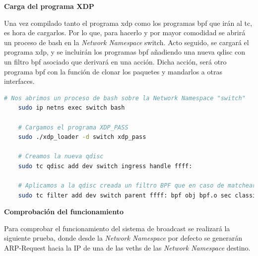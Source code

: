 \vspace{1cm}
\textbf{Carga del programa XDP}\\
\par
Una vez compilado tanto el programa \gls{xdp} como los programas \gls{bpf} que irán al \gls{tc}, es hora de cargarlos. Por lo que, para hacerlo y por mayor comodidad se abrirá un proceso de bash en la \textit{Network Namespace} switch. Acto seguido, se cargará el programa \gls{xdp}, y se incluirán los programas \gls{bpf} añadiendo una nueva qdisc con un filtro \gls{bpf} asociado que derivará en una acción. Dicha acción, será otro programa \gls{bpf} con la función de clonar los paquetes y mandarlos a otras interfaces.\\
\par
\begin{lstlisting}[language= bash, style=Consola, caption={Carga del programa XDP - Case05},label=code:case05_xdp_ether_load]
    # Nos abrimos un proceso de bash sobre la Network Namespace "switch"
    sudo ip netns exec switch bash
    
    # Cargamos el programa XDP_PASS
    sudo ./xdp_loader -d switch xdp_pass
    
    # Creamos la nueva qdisc
    sudo tc qdisc add dev switch ingress handle ffff:
    
    # Aplicamos a la qdisc creada un filtro BPF que en caso de matchear aplicará una acción (Otro programa BPF que hará nuestro broadcast)
    sudo tc filter add dev switch parent ffff: bpf obj bpf.o sec classifier flowid ffff:1 action bpf obj bpf.o sec action 
\end{lstlisting}

\vspace{1cm}
\textbf{Comprobación del funcionamiento}\\
\par
Para comprobar el funcionamiento del sistema de broadcast se realizará la siguiente prueba, donde desde la \textit{Network Namespace} por defecto se generarán ARP-Request hacia la IP de una de las \gls{veth}s de las \textit{Network Namespace} destino. \\
\par

